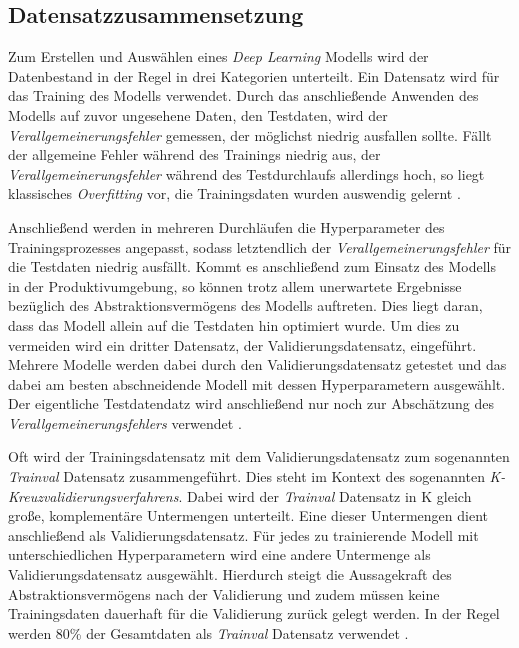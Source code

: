 \subsection*{Datensatzzusammensetzung}

Zum Erstellen und Auswählen eines \textit{Deep Learning} Modells wird der Datenbestand in der Regel in drei Kategorien unterteilt. Ein Datensatz wird für das Training des Modells verwendet. Durch das anschließende Anwenden des Modells auf zuvor ungesehene Daten, den Testdaten, wird der \textit{Verallgemeinerungsfehler} gemessen, der möglichst niedrig ausfallen sollte. Fällt der allgemeine Fehler während des Trainings niedrig aus, der \textit{Verallgemeinerungsfehler} während des Testdurchlaufs allerdings hoch, so liegt klassisches \textit{Overfitting} vor, die Trainingsdaten wurden auswendig gelernt \cite{AurelienGeron.2018}. 

Anschließend werden in mehreren Durchläufen die Hyperparameter des Trainingsprozesses angepasst, sodass letztendlich der \textit{Verallgemeinerungsfehler} für die Testdaten niedrig ausfällt. Kommt es anschließend zum Einsatz des Modells in der Produktivumgebung, so können trotz allem unerwartete Ergebnisse bezüglich des Abstraktionsvermögens des Modells auftreten. Dies liegt daran, dass das Modell allein auf die Testdaten hin optimiert wurde. Um dies zu vermeiden wird ein dritter Datensatz, der Validierungsdatensatz, eingeführt. Mehrere Modelle werden dabei durch den Validierungsdatensatz getestet und das dabei am besten abschneidende Modell mit dessen Hyperparametern ausgewählt. Der eigentliche Testdatendatz wird anschließend nur noch zur Abschätzung des \textit{Verallgemeinerungsfehlers} verwendet \cite{AurelienGeron.2018}. 

Oft wird der Trainingsdatensatz mit dem Validierungsdatensatz zum sogenannten \textit{Trainval} Datensatz zusammengeführt. Dies steht im Kontext des sogenannten \textit{K-Kreuzvalidierungsverfahrens}. Dabei wird der \textit{Trainval} Datensatz in K gleich große, komplementäre Untermengen unterteilt. Eine dieser Untermengen dient anschließend als Validierungsdatensatz. Für jedes zu trainierende Modell mit unterschiedlichen Hyperparametern wird eine andere Untermenge als Validierungsdatensatz ausgewählt. Hierdurch steigt die Aussagekraft des Abstraktionsvermögens nach der Validierung und zudem müssen keine Trainingsdaten dauerhaft für die Validierung zurück gelegt werden. In der Regel werden 80\% der Gesamtdaten als \textit{Trainval} Datensatz verwendet \cite{AurelienGeron.2018}.

